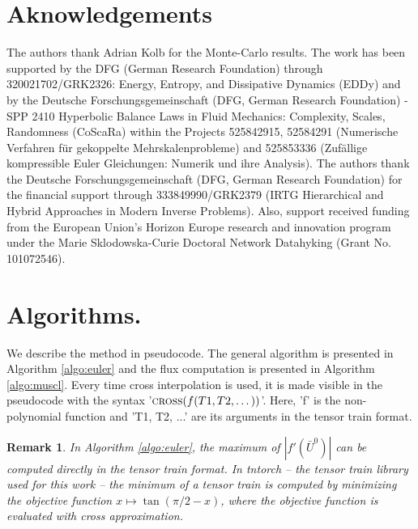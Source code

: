 \documentclass{article}
\newtheorem{remark}{Remark}
\begin{document}
\section*{Aknowledgements}
The authors thank Adrian Kolb for the Monte-Carlo results.
The work has been supported by the  DFG (German Research Foundation) through 320021702/GRK2326: Energy, Entropy, and Dissipative Dynamics (EDDy) and by the Deutsche Forschungsgemeinschaft (DFG, German Research Foundation) - SPP 2410 Hyperbolic Balance Laws in Fluid Mechanics: Complexity, Scales, Randomness (CoScaRa) within the Projects 525842915, 52584291 (Numerische Verfahren für gekoppelte Mehrskalenprobleme) and 
 525853336 (Zufällige kompressible Euler Gleichungen: Numerik und ihre Analysis). The authors thank the Deutsche Forschungsgemeinschaft (DFG, German Research Foundation) for the financial support through 333849990/GRK2379
(IRTG Hierarchical and Hybrid Approaches in Modern Inverse Problems).
Also, support received funding from the European Union’s Horizon Europe research and innovation program under the Marie Sklodowska-Curie Doctoral Network Datahyking (Grant No. 101072546).







\appendix
\section{Algorithms.} \label{sec:Algo}
We describe the method in pseudocode. 
The general algorithm is presented in Algorithm \ref{algo:euler} and the flux computation is presented in Algorithm \ref{algo:muscl}.
Every time cross interpolation is used, it is made visible in the pseudocode with the syntax '$\Call{cross}{f(T1, T2, \dots)}$'. 
Here, 'f' is the non-polynomial function and 'T1, T2, ...' are its arguments in the tensor train format.

\begin{remark}
    In Algorithm \ref{algo:euler}, the maximum of $|f'(\bar U^0)|$ can be computed directly in the tensor train format. 
    In tntorch -- the tensor train library used for this work -- the minimum of a tensor train is computed by minimizing the objective function $x \mapsto \tan(\pi/2 - x)$, where the objective function is evaluated with cross approximation. 
\end{remark}
\end{document}
